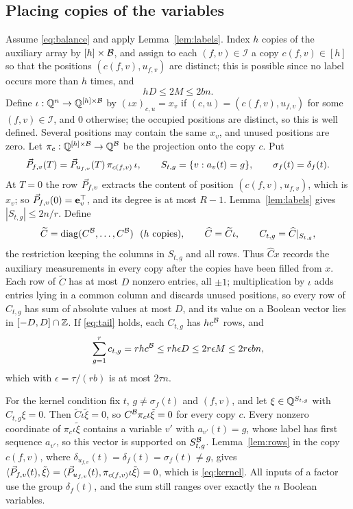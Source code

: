 \subsection{Placing copies of the variables}
Assume \eqref{eq:balance} and apply Lemma~\ref{lem:labels}. Index $h$ copies of
the auxiliary array by $[h]\times\mathcal{B}$, and assign to each $(f,v)\in\mathcal I$ a
copy $c(f,v)\in[h]$ so that the positions $(c(f,v),u_{f,v})$ are distinct; this is
possible since no label occurs more than $h$ times, and
\begin{equation}\label{eq:hD}
  hD\le 2M\le 2bn .
\end{equation}
Define $\iota:\mathbb{Q}^n\to\mathbb{Q}^{[h]\times\mathcal{B}}$ by $(\iota x)_{c,u}=x_v$ if
$(c,u)=(c(f,v),u_{f,v})$ for some $(f,v)\in\mathcal I$, and $0$ otherwise; the
occupied positions are distinct, so this is well defined. Several positions may
contain the same $x_v$, and unused positions are zero. Let
$\pi_c:\mathbb{Q}^{[h]\times\mathcal{B}}\to\mathbb{Q}^{\mathcal{B}}$ be the projection onto the copy $c$. Put
\begin{equation}\label{eq:Pfv}
  \vec{P}_{f,v}(T)=\vec{P}_{u_{f,v}}(T)\,\pi_{c(f,v)}\,\iota,\qquad
  S_{t,g}=\{v:a_v(t)=g\},\qquad \sigma_f(t)=\delta_f(t).
\end{equation}
At $T=0$ the row $\vec{P}_{f,v}$ extracts the content of position $(c(f,v),u_{f,v})$,
which is $x_v$; so $\vec{P}_{f,v}(0)=\mathbf{e}_v^{\top}$, and its degree is at most $R-1$.
Lemma~\ref{lem:labels} gives $|S_{t,g}|\le 2n/r$. Define
\begin{equation}\label{eq:Ctg}
  \widetilde C=\operatorname{diag}(C^{\mathcal{B}},\dots,C^{\mathcal{B}})\ \ (h\text{ copies}),\qquad
  \widehat C=\widetilde C\iota,\qquad C_{t,g}=\widehat C|_{S_{t,g}},
\end{equation}
the restriction keeping the columns in $S_{t,g}$ and all rows. Thus
$\widehat Cx$ records the auxiliary measurements in every copy after the copies
have been filled from $x$. Each row of $\widetilde C$ has at most $D$ nonzero
entries, all $\pm1$; multiplication by $\iota$ adds entries lying in a common
column and discards unused positions, so every row of $C_{t,g}$ has sum of
absolute values at most $D$, and its value on a Boolean vector lies in
$[-D,D]\cap\mathbb{Z}$. If \eqref{eq:tail} holds, each $C_{t,g}$ has $hc^{\mathcal{B}}$ rows, and
\begin{equation}\label{eq:ctg}
  \sum_{g=1}^{r}c_{t,g}=rhc^{\mathcal{B}}\le rh\epsilon D\le 2r\epsilon M\le 2r\epsilon bn,
\end{equation}
which with $\epsilon=\tau/(rb)$ is at most $2\tau n$.

For the kernel condition fix $t$, $g\ne\sigma_f(t)$ and $(f,v)$, and let
$\xi\in\mathbb{Q}^{S_{t,g}}$ with $C_{t,g}\xi=0$. Then $\widetilde C\iota\tilde\xi=0$, so
$C^{\mathcal{B}}\pi_c\iota\tilde\xi=0$ for every copy $c$. Every nonzero coordinate of
$\pi_c\iota\tilde\xi$ contains a variable $v'$ with $a_{v'}(t)=g$, whose label has
first sequence $a_{v'}$, so this vector is supported on $S^{\mathcal{B}}_{t,g}$.
Lemma~\ref{lem:rows} in the copy $c(f,v)$, where $\delta_{u_{f,v}}(t)=\delta_f(t)=\sigma_f(t)\ne g$,
gives $\langle \vec{P}_{f,v}(t),\tilde\xi\rangle=\langle \vec{P}_{u_{f,v}}(t),\pi_{c(f,v)}\iota\tilde\xi\rangle=0$,
which is \eqref{eq:kernel}. All inputs of a factor use the group $\delta_f(t)$,
and the sum still ranges over exactly the $n$ Boolean variables.


